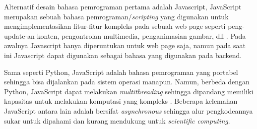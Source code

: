 

        Alternatif desain bahasa pemrograman pertama adalah Javascript, JavaScript merupakan sebuah bahasa pemrograman/\textit{scripting} yang digunakan untuk
        mengimplementasikan fitur-fitur kompleks pada sebuah web page seperti peng-update-an
        konten, pengontrolan multimedia, penganimasian gambar, dll \citep{js}. Pada awalnya Javascript hanya
        diperuntukan untuk web page saja, namun pada saat ini Javascript dapat digunakan sebagai
        bahasa yang digunakan pada backend.

        Sama seperti Python, JavaScript adalah bahasa pemrograman yang portabel sehingga bisa dijalankan pada sistem operasi manapun.
        Namun, berbeda dengan Python, JavaScript dapat melakukan \textit{multithreading} sehingga dipandang memiliki kapasitas untuk
        melakukan komputasi yang kompleks \citep{jsDisad}. Beberapa kelemahan JavaScript antara lain adalah bersifat \textit{asynchronous} sehingga
        alur pengkodeannya sukar untuk dipahami dan kurang mendukung untuk \textit{scientific computing}.
        


